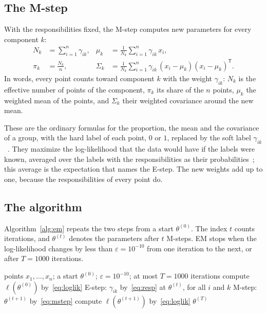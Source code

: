 \documentclass[11pt,a4paper]{amsart}
\numberwithin{equation}{section}
\theoremstyle{plain}
\theoremstyle{definition}
\theoremstyle{remark}
\newcommand{\T}{\mathsf{T}}
\begin{document}
\subsection{The M-step}\label{sec:mstep}

With the responsibilities fixed, the M-step computes new parameters for
every component $k$:
\begin{equation}\label{eq:mstep}
\begin{aligned}
  N_k &= \sum_{i=1}^{n} \gamma_{ik}, &
  \mu_k &= \frac{1}{N_k} \sum_{i=1}^{n} \gamma_{ik}\, x_i, \\
  \pi_k &= \frac{N_k}{n}, &
  \Sigma_k &= \frac{1}{N_k} \sum_{i=1}^{n} \gamma_{ik}\,
    (x_i - \mu_k)(x_i - \mu_k)^\T .
\end{aligned}
\end{equation}
In words, every point counts toward component $k$ with the weight
$\gamma_{ik}$: $N_k$ is the effective number of points of the component,
$\pi_k$ its share of the $n$ points, $\mu_k$ the weighted mean of the
points, and $\Sigma_k$ their weighted covariance around the new mean.

These are the ordinary formulas for the proportion, the mean and the
covariance of a group, with the hard label of each point, $0$ or $1$,
replaced by the soft label $\gamma_{ik}$~\cite[Section~9.2]{bishop2006}.
They maximize the log-likelihood that the data would have if the labels
were known, averaged over the labels with the responsibilities as their
probabilities~\cite{bishop2006,mclachlan2008}; this average is the
expectation that names the E-step. The new weights add up to one,
because the responsibilities of every point do.

\subsection{The algorithm}\label{sec:algorithm}

Algorithm~\ref{alg:em} repeats the two steps from a start
$\theta^{(0)}$. The index $t$ counts iterations, and $\theta^{(t)}$
denotes the parameters after $t$ M-steps. EM stops when the
log-likelihood changes by less than $\varepsilon = 10^{-10}$ from one
iteration to the next, or after $T = 1000$ iterations.

\begin{algorithm}[htb]
\caption{EM for a Gaussian mixture}\label{alg:em}
\small
\begin{algorithmic}[1]
\Require points $x_1, \dots, x_n$; a start $\theta^{(0)}$;
  $\varepsilon = 10^{-10}$; at most $T = 1000$ iterations
\State compute $\ell(\theta^{(0)})$ by~\eqref{eq:loglik}
  \State E-step: $\gamma_{ik}$ by~\eqref{eq:resp} at $\theta^{(t)}$, for
    all $i$ and $k$
  \State M-step: $\theta^{(t+1)}$ by~\eqref{eq:mstep}
  \State compute $\ell(\theta^{(t+1)})$ by~\eqref{eq:loglik}
\EndFor
\State \Return $\theta^{(T)}$
\end{algorithmic}
\end{algorithm}
\end{document}
